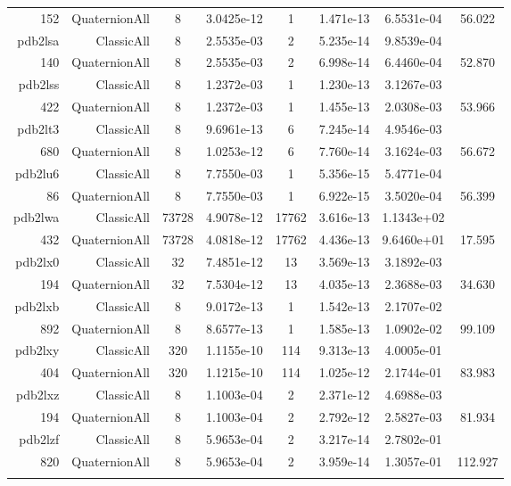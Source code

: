 \begin{xltabular}{\textwidth}{r|rcS[table-format=1.4e+2]cS[table-format=1.3e+2]S[table-format=1.4e+2]S[table-format=-1.3]}
152 & QuaternionAll & 8 & 3.0425e-12 & 1 & 1.471e-13 & 6.5531e-04 & 56.022\\  \addlinespace
pdb2lsa & ClassicAll & 8 & 2.5535e-03 & 2 & 5.235e-14 & 9.8539e-04 & \\
140 & QuaternionAll & 8 & 2.5535e-03 & 2 & 6.998e-14 & 6.4460e-04 & 52.870\\  \addlinespace
pdb2lss & ClassicAll & 8 & 1.2372e-03 & 1 & 1.230e-13 & 3.1267e-03 & \\
422 & QuaternionAll & 8 & 1.2372e-03 & 1 & 1.455e-13 & 2.0308e-03 & 53.966\\  \addlinespace
pdb2lt3 & ClassicAll & 8 & 9.6961e-13 & 6 & 7.245e-14 & 4.9546e-03 & \\
680 & QuaternionAll & 8 & 1.0253e-12 & 6 & 7.760e-14 & 3.1624e-03 & 56.672\\  \addlinespace
pdb2lu6 & ClassicAll & 8 & 7.7550e-03 & 1 & 5.356e-15 & 5.4771e-04 & \\
86 & QuaternionAll & 8 & 7.7550e-03 & 1 & 6.922e-15 & 3.5020e-04 & 56.399\\  \addlinespace
pdb2lwa & ClassicAll & 73728 & 4.9078e-12 & 17762 & 3.616e-13 & 1.1343e+02 & \\
432 & QuaternionAll & 73728 & 4.0818e-12 & 17762 & 4.436e-13 & 9.6460e+01 & 17.595\\  \addlinespace
pdb2lx0 & ClassicAll & 32 & 7.4851e-12 & 13 & 3.569e-13 & 3.1892e-03 & \\
194 & QuaternionAll & 32 & 7.5304e-12 & 13 & 4.035e-13 & 2.3688e-03 & 34.630\\  \addlinespace
pdb2lxb & ClassicAll & 8 & 9.0172e-13 & 1 & 1.542e-13 & 2.1707e-02 & \\
892 & QuaternionAll & 8 & 8.6577e-13 & 1 & 1.585e-13 & 1.0902e-02 & 99.109\\  \addlinespace
pdb2lxy & ClassicAll & 320 & 1.1155e-10 & 114 & 9.313e-13 & 4.0005e-01 & \\
404 & QuaternionAll & 320 & 1.1215e-10 & 114 & 1.025e-12 & 2.1744e-01 & 83.983\\  \addlinespace
pdb2lxz & ClassicAll & 8 & 1.1003e-04 & 2 & 2.371e-12 & 4.6988e-03 & \\
194 & QuaternionAll & 8 & 1.1003e-04 & 2 & 2.792e-12 & 2.5827e-03 & 81.934\\  \addlinespace
pdb2lzf & ClassicAll & 8 & 5.9653e-04 & 2 & 3.217e-14 & 2.7802e-01 & \\
820 & QuaternionAll & 8 & 5.9653e-04 & 2 & 3.959e-14 & 1.3057e-01 & 112.927\\  \addlinespace

\end{xltabular}
